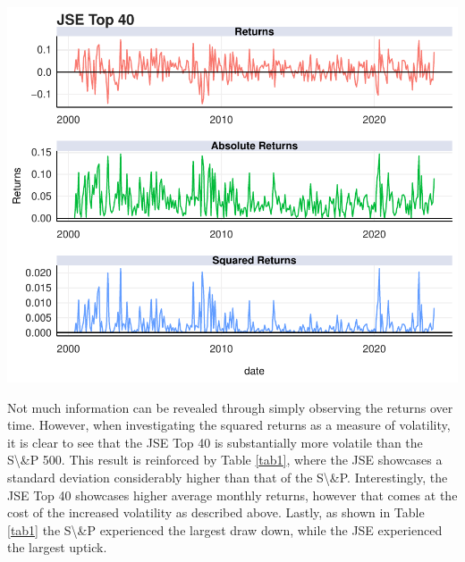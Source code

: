 \documentclass[11pt,preprint, authoryear]{elsarticle}
\let\origfigure\figure
\let\endorigfigure\endfigure
\renewenvironment{figure}[1][2] {
    \expandafter\origfigure\expandafter[H]
} {
    \endorigfigure
}
\numberwithin{equation}{section}
\numberwithin{figure}{section}
\numberwithin{table}{section}
\begin{document}
\begin{figure}[H]

{\centering \includegraphics{Template_files/figure-latex/Figure2-1} 

}

\caption{JSE Top 40 Returns \label{Figure2}}\label{fig:Figure2}
\end{figure}

Not much information can be revealed through simply observing the
returns over time. However, when investigating the squared returns as a
measure of volatility, it is clear to see that the JSE Top 40 is
substantially more volatile than the S\textbackslash\&P 500. This result
is reinforced by Table \ref{tab1}, where the JSE showcases a standard
deviation considerably higher than that of the S\textbackslash\&P.
Interestingly, the JSE Top 40 showcases higher average monthly returns,
however that comes at the cost of the increased volatility as described
above. Lastly, as shown in Table \ref{tab1} the S\textbackslash\&P
experienced the largest draw down, while the JSE experienced the largest
uptick.
\end{document}
